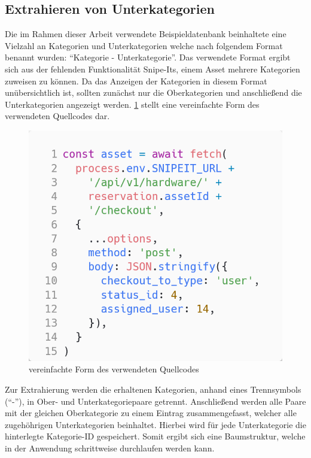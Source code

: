 \subsection{Extrahieren von Unterkategorien}
Die im Rahmen dieser Arbeit verwendete Beispieldatenbank beinhaltete eine Vielzahl an Kategorien und
Unterkategorien welche nach folgendem Format benannt wurden: \enquote{Kategorie - Unterkategorie}.
Das verwendete Format ergibt sich aus der fehlenden Funktionalität Snipe-Its, einem Asset mehrere
Kategorien zuweisen zu können. Da das Anzeigen der Kategorien in diesem Format unübersichtlich ist,
sollten zunächst nur die Oberkategorien und anschließend die Unterkategorien angezeigt werden.
\ref{fig:categoriecode} stellt eine vereinfachte Form des verwendeten Quellcodes dar.
\begin{figure}[h]
  \centering
  \includegraphics[scale=0.4]{Bilder/carbon(1).png}
  \caption[vereinfachte Form des verwendeten Quellcodes]{vereinfachte Form des verwendeten Quellcodes}
  \label{fig:categoriecode}
\end{figure}

Zur Extrahierung werden die erhaltenen Kategorien, anhand eines Trennsymbols (\enquote{-}), in Ober- und
Unterkategoriepaare getrennt. Anschließend werden alle Paare mit der gleichen Oberkategorie zu einem
Eintrag zusammengefasst, welcher alle zugehöhrigen Unterkategorien beinhaltet. Hierbei wird für jede
Unterkategorie die hinterlegte Kategorie-ID gespeichert. Somit ergibt sich eine Baumstruktur, welche
in der Anwendung schrittweise durchlaufen werden kann.


